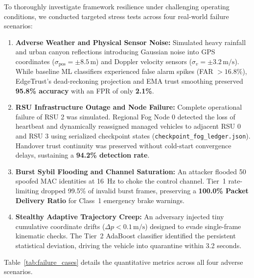 \documentclass[conference]{IEEEtran}
\begin{document}
To thoroughly investigate framework resilience under challenging operating conditions, we conducted targeted stress tests across four real-world failure scenarios:
\begin{enumerate}
    \item \textbf{Adverse Weather and Physical Sensor Noise:} Simulated heavy rainfall and urban canyon reflections introducing Gaussian noise into GPS coordinates ($\sigma_{\text{pos}} = \pm 8.5\,\text{m}$) and Doppler velocity sensors ($\sigma_v = \pm 3.2\,\text{m/s}$). While baseline ML classifiers experienced false alarm spikes (FAR $> 16.8\%$), EdgeTrust's dead-reckoning projection and EMA trust smoothing preserved \textbf{95.8\% accuracy} with an FPR of only \textbf{2.1\%}.
    \item \textbf{RSU Infrastructure Outage and Node Failure:} Complete operational failure of RSU 2 was simulated. Regional Fog Node 0 detected the loss of heartbeat and dynamically reassigned managed vehicles to adjacent RSU 0 and RSU 3 using serialized checkpoint states (\texttt{checkpoint\_fog\_ledger.json}). Handover trust continuity was preserved without cold-start convergence delays, sustaining a \textbf{94.2\% detection rate}.
    \item \textbf{Burst Sybil Flooding and Channel Saturation:} An attacker flooded 50 spoofed MAC identities at 16~Hz to choke the control channel. Tier~1 rate-limiting dropped 99.5\% of invalid burst frames, preserving a \textbf{100.0\% Packet Delivery Ratio} for Class~1 emergency brake warnings.
    \item \textbf{Stealthy Adaptive Trajectory Creep:} An adversary injected tiny cumulative coordinate drifts ($\Delta p < 0.1\,\text{m/s}$) designed to evade single-frame kinematic checks. The Tier~2 AdaBoost classifier identified the persistent statistical deviation, driving the vehicle into quarantine within 3.2 seconds.
\end{enumerate}

Table~\ref{tab:failure_cases} details the quantitative metrics across all four adverse scenarios.
\end{document}
